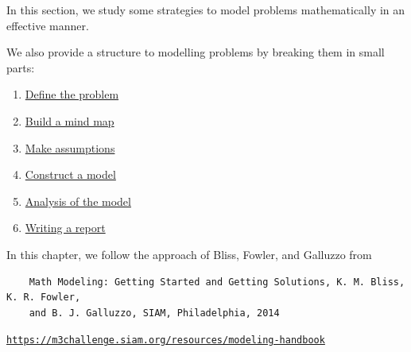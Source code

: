 
%
%


\begin{topic}


In this section, we study some strategies to model problems mathematically in an effective manner.

We also provide a structure to modelling problems by breaking them in small parts:

\begin{enumerate}[label={\bf \arabic*.}]
	\item \hyperref[define]{Define the problem}
	\item \hyperref[mindmap]{Build a mind map}
	\item \hyperref[assumption]{Make assumptions}
	\item \hyperref[model]{Construct a model}
	\item \hyperref[analysis]{Analysis of the model}
	\item \hyperref[report]{Writing a report}
\end{enumerate}

\vspace{2cm}

In this chapter, we follow the approach of Bliss, Fowler, and Galluzzo from
\begin{graybox}
\begin{minipage}{.75\textwidth}
\begin{verbatim}
	Math Modeling: Getting Started and Getting Solutions, K. M. Bliss, K. R. Fowler, 
	and B. J. Galluzzo, SIAM, Philadelphia, 2014
\end{verbatim}
\begin{center}
\href{https://m3challenge.siam.org/resources/modeling-handbook}{\tt https://m3challenge.siam.org/resources/modeling-handbook}
\end{center}
\end{minipage}
\hfill
\begin{minipage}{.20\textwidth}
	\hfill{}	
\end{minipage}
\end{graybox}





\end{topic}

